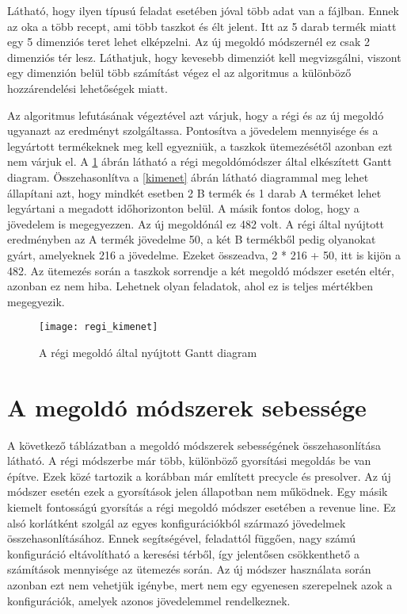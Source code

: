 Látható, hogy ilyen típusú feladat esetében jóval több adat van a fájlban. Ennek az oka a több recept, ami több taszkot és élt jelent. Itt az 5 darab termék miatt egy 5 dimenziós teret lehet elképzelni. Az új megoldó módszernél ez csak 2 dimenziós tér lesz. Láthatjuk, hogy kevesebb dimenziót kell megvizsgálni, viszont egy dimenzión belül több számítást végez el az algoritmus a különböző hozzárendelési lehetőségek miatt. 

Az algoritmus lefutásának végeztével azt várjuk, hogy a régi és az új megoldó ugyanazt az eredményt szolgáltassa. Pontosítva a jövedelem mennyisége és a legyártott termékeknek meg kell egyezniük, a taszkok ütemezésétől azonban ezt nem várjuk el. A \ref{regi_kimenet} ábrán látható a régi megoldómódszer által elkészített Gantt diagram. Összehasonlítva a \ref{kimenet} ábrán látható diagrammal meg lehet állapítani azt, hogy mindkét esetben 2 B termék és 1 darab A terméket lehet legyártani a megadott időhorizonton belül. A másik fontos dolog, hogy a jövedelem is megegyezzen. Az új megoldónál ez 482 volt. A régi által nyújtott eredményben az A termék jövedelme 50, a két B termékből pedig olyanokat gyárt, amelyeknek 216 a jövedelme. Ezeket összeadva, 2 * 216 + 50, itt is kijön a 482. Az ütemezés során a taszkok sorrendje a két megoldó módszer esetén eltér, azonban ez nem hiba. Lehetnek olyan feladatok, ahol ez is teljes mértékben megegyezik.
\begin{figure}[H]
\begin{center}
\texttt{[image: regi\_kimenet]}
\caption{A régi megoldó által nyújtott Gantt diagram}
\label{regi_kimenet}
\end{center}
\end{figure}

\section{A megoldó módszerek sebessége}
A következő táblázatban a megoldó módszerek sebességének összehasonlítása látható. A régi módszerbe már több, különböző gyorsítási megoldás be van építve. Ezek közé tartozik a korábban már említett precycle és presolver. Az új módszer esetén ezek a gyorsítások jelen állapotban nem működnek. Egy másik kiemelt fontosságú gyorsítás a régi megoldó módszer esetében a revenue line. Ez alsó korlátként szolgál az egyes konfigurációkból származó jövedelmek összehasonlításához. Ennek segítségével, feladattól függően, nagy számú konfiguráció eltávolítható a keresési térből, így jelentősen csökkenthető a számítások mennyisége az ütemezés során. Az új módszer használata során azonban ezt nem vehetjük igénybe, mert nem egy egyenesen szerepelnek azok a konfigurációk, amelyek azonos jövedelemmel rendelkeznek. 

